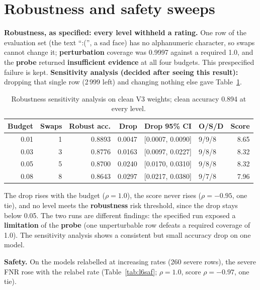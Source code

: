 \section{Robustness and safety sweeps}\label{sec:l6}
\textbf{Robustness, as specified: every level withheld a rating.} One row of the evaluation set (the text ``:('', a sad face) has no alphanumeric character, so swaps cannot change it; \textbf{perturbation} coverage was 0.9997 against a required 1.0, and the \textbf{probe} returned \textbf{insufficient evidence} at all four budgets. This prespecified failure is kept. \textbf{Sensitivity analysis (decided after seeing this result):} dropping that single row (2\,999 left) and changing nothing else gave Table~\ref{tab:l6rob}.

\begin{table}[!htbp]
\centering\small
\caption{Robustness sensitivity analysis on clean V3 weights; clean accuracy 0.894 at every level.}\label{tab:l6rob}
\begin{tabularx}{\textwidth}{|r|r|r|r|r|l|r|}
\hline
\textbf{Budget} & \textbf{Swaps} & \textbf{Robust acc.} & \textbf{Drop} & \textbf{Drop 95\% CI} & \textbf{O/S/D} & \textbf{Score}\\
\hline
0.01 & 1 & 0.8893 & 0.0047 & [0.0007, 0.0090] & 9/9/8 & 8.65\\ \hline
0.03 & 3 & 0.8776 & 0.0163 & [0.0097, 0.0227] & 9/8/8 & 8.32\\ \hline
0.05 & 5 & 0.8700 & 0.0240 & [0.0170, 0.0310] & 9/8/8 & 8.32\\ \hline
0.08 & 8 & 0.8643 & 0.0297 & [0.0217, 0.0380] & 9/7/8 & 7.96\\
\hline
\end{tabularx}
\end{table}

The drop rises with the budget ($\rho=1.0$), the score never rises ($\rho=-0.95$, one tie), and no level meets the \textbf{robustness} risk threshold, since the drop stays below 0.05. The two runs are different findings: the specified run exposed a \textbf{limitation} of the \textbf{probe} (one unperturbable row defeats a required coverage of 1.0). The sensitivity analysis shows a consistent but small accuracy drop on one model.

\textbf{Safety.} On the models relabelled at increasing rates (260 severe rows), the severe FNR rose with the relabel rate (Table~\ref{tab:l6saf}; $\rho=1.0$, score $\rho=-0.97$, one tie).

